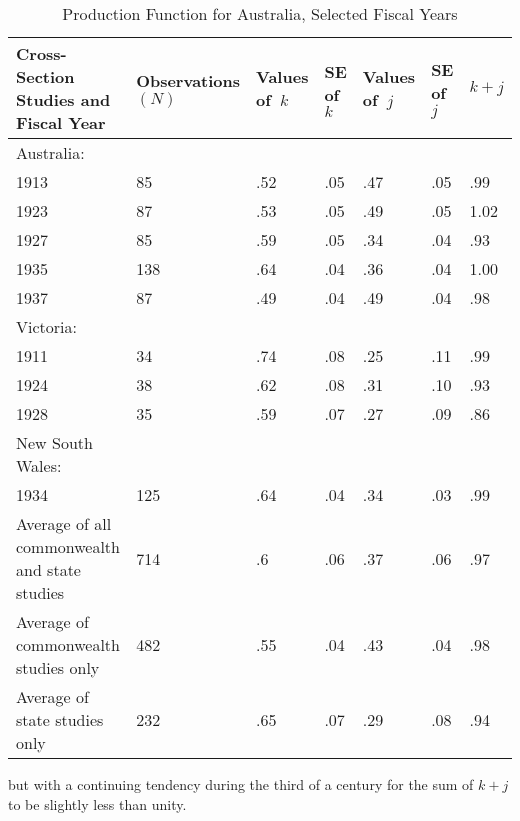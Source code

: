 \documentclass{article}
\begin{document}
\begin{table}[!t]
\centering
\footnotesize{
\caption{Production Function for Australia, Selected Fiscal Years}%
\label{tab2}%
\begin{tabular}{p{}p{}p{}p{}p{}p{}p{}}
\hline
Cross-Section Studies and Fiscal Year & Observations \((N)\) & Values of~\(k\) & SE of \(k\) & Values of~\(j\) & SE of \(j\) & \(k + j\)\\
\hline
Australia: &  &  &  &  &  &  \\
\hspace{3mm} 1913 & 85 & .52 & .05 & .47 & .05 & .99\\
\hspace{3mm} 1923 & 87 & .53 & .05 & .49 & .05 & 1.02\\
\hspace{3mm} 1927 & 85 & .59 & .05 & .34 & .04 & .93\\
\hspace{3mm} 1935 & 138 & .64 & .04 & .36 & .04 & 1.00\\
\hspace{3mm} 1937 & 87 & .49 & .04 & .49 & .04 & .98\\
Victoria: &  &  &  &  &  & \\
\hspace{3mm} 1911 & 34 & .74 & .08 & .25 & .11 & .99\\
\hspace{3mm} 1924 & 38 & .62 & .08 & .31 & .10 & .93\\
\hspace{3mm} 1928 & 35 & .59 & .07 & .27 & .09 & .86\\
New South Wales: &  &  &  &  &  & \\
1934 & 125 & .64 & .04 & .34 & .03 & .99\\
Average of all commonwealth and state studies & 714 & .6 & .06 & .37 & .06 & .97\\
Average of commonwealth studies only & 482 & .55 & .04 & .43 & .04 & .98\\
Average of state studies only & 232 & .65 & .07 & .29 & .08 & .94\\

\hline

\end{tabular}
}
\end{table}
but with a continuing tendency during the third of a century for the sum of \(k + j\) to be slightly less than unity.
\end{document}
